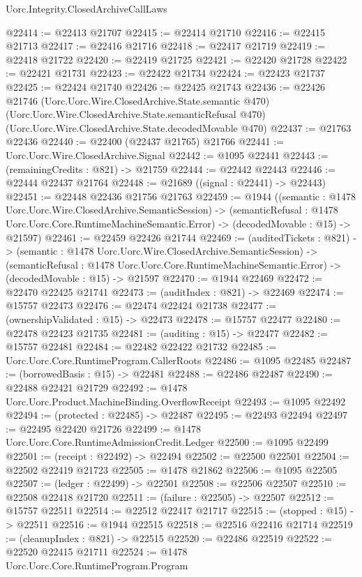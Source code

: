 \begin{lexlean}{Uorc.Integrity.ClosedArchiveCallLaws}
\begin{coremodule}
@22414 := @22413 @21707
@22415 := @22414 @21710
@22416 := @22415 @21713
@22417 := @22416 @21716
@22418 := @22417 @21719
@22419 := @22418 @21722
@22420 := @22419 @21725
@22421 := @22420 @21728
@22422 := @22421 @21731
@22423 := @22422 @21734
@22424 := @22423 @21737
@22425 := @22424 @21740
@22426 := @22425 @21743
@22436 := @22426
    @21746
    (Uorc.Uorc.Wire.ClosedArchive.State.semantic @470)
    (Uorc.Uorc.Wire.ClosedArchive.State.semanticRefusal @470)
    (Uorc.Uorc.Wire.ClosedArchive.State.decodedMovable @470)
@22437 := @21763 @22436
@22440 := @22400 (@22437 @21765) @21766
@22441 := Uorc.Uorc.Wire.ClosedArchive.Signal
@22442 := @1095 @22441
@22443 := (remainingCredits : @821) -> @21759
@22444 := @22442 @22443
@22446 := @22444 @22437 @21764
@22448 := @21689 ((signal : @22441) -> @22443)
@22451 := @22448 @22436 @21756 @21763
@22459 := @1944
    ((semantic : @1478 Uorc.Uorc.Wire.ClosedArchive.SemanticSession) ->
    (semanticRefusal : @1478 Uorc.Uorc.Core.RuntimeMachineSemantic.Error) ->
    (decodedMovable : @15) -> @21597)
@22461 := @22459 @22426 @21744
@22469 := (auditedTickets : @821) ->
  (semantic : @1478 Uorc.Uorc.Wire.ClosedArchive.SemanticSession) ->
  (semanticRefusal : @1478 Uorc.Uorc.Core.RuntimeMachineSemantic.Error) ->
  (decodedMovable : @15) -> @21597
@22470 := @1944 @22469
@22472 := @22470 @22425 @21741
@22473 := (auditIndex : @821) -> @22469
@22474 := @15757 @22473
@22476 := @22474 @22424 @21738
@22477 := (ownershipValidated : @15) -> @22473
@22478 := @15757 @22477
@22480 := @22478 @22423 @21735
@22481 := (auditing : @15) -> @22477
@22482 := @15757 @22481
@22484 := @22482 @22422 @21732
@22485 := Uorc.Uorc.Core.RuntimeProgram.CallerRoots
@22486 := @1095 @22485
@22487 := (borrowedBasis : @15) -> @22481
@22488 := @22486 @22487
@22490 := @22488 @22421 @21729
@22492 := @1478 Uorc.Uorc.Product.MachineBinding.OverflowReceipt
@22493 := @1095 @22492
@22494 := (protected : @22485) -> @22487
@22495 := @22493 @22494
@22497 := @22495 @22420 @21726
@22499 := @1478 Uorc.Uorc.Core.RuntimeAdmissionCredit.Ledger
@22500 := @1095 @22499
@22501 := (receipt : @22492) -> @22494
@22502 := @22500 @22501
@22504 := @22502 @22419 @21723
@22505 := @1478 @21862
@22506 := @1095 @22505
@22507 := (ledger : @22499) -> @22501
@22508 := @22506 @22507
@22510 := @22508 @22418 @21720
@22511 := (failure : @22505) -> @22507
@22512 := @15757 @22511
@22514 := @22512 @22417 @21717
@22515 := (stopped : @15) -> @22511
@22516 := @1944 @22515
@22518 := @22516 @22416 @21714
@22519 := (cleanupIndex : @821) -> @22515
@22520 := @22486 @22519
@22522 := @22520 @22415 @21711
@22524 := @1478 Uorc.Uorc.Core.RuntimeProgram.Program

\end{coremodule}
\end{lexlean}
